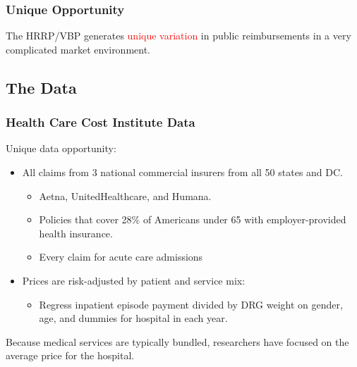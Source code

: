 \documentclass[ucs,9pt]{beamer}
\begin{document}
\begin{frame}
\frametitle{Unique Opportunity}
The HRRP/VBP generates \textcolor{red}{unique variation} in public reimbursements in a very complicated market environment.

\end{frame}













\subsection{The Data}










\begin{frame}
\frametitle{Health Care Cost Institute Data}
Unique data opportunity:
\begin{itemize}
\item All claims from 3 national commercial insurers from all 50 states and DC. 
\begin{itemize}
\item Aetna, UnitedHealthcare, and Humana.
\item Policies that cover 28$\%$ of Americans under 65 with employer-provided health insurance.
\item Every claim for acute care admissions
\end{itemize}
\item Prices are risk-adjusted by patient and service mix: 
\begin{itemize}
\item Regress inpatient episode payment divided by DRG weight on gender, age, and dummies for hospital in each year.  
\end{itemize}
\end{itemize}
Because medical services are typically bundled, researchers have focused on the average price for the hospital.  
\end{frame}
\end{document}

